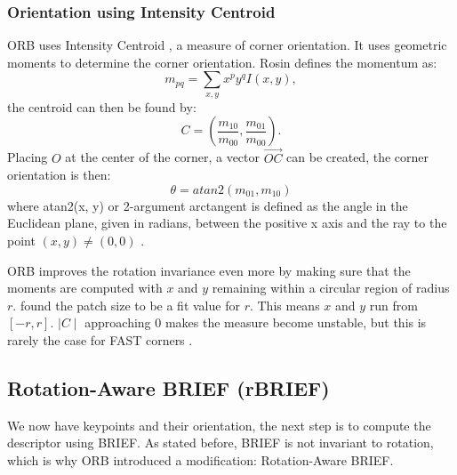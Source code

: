 \subsubsection{Orientation using Intensity Centroid}
ORB uses Intensity Centroid \cite{ROSIN1999291}, a measure of corner orientation. It uses geometric moments to determine the corner orientation. Rosin defines the momentum as: 
\begin{equation}
    m_{pq} = \sum_{x,y} x^p y^q I(x, y),
\end{equation}
the centroid can then be found by:
\begin{equation}
    C = (\frac{m_{10}}{m_{00}},\frac{m_{01}}{m_{00}}).
\end{equation}
Placing $O$ at the center of the corner, a vector $\Vec{OC}$ can be created, the corner orientation is then:
\begin{equation}
    \theta = atan2(m_{01}, m_{10})
\end{equation}
where atan2(x, y) or 2-argument arctangent is defined as the angle in the Euclidean plane, given in radians, between the positive x axis and the ray to the point $(x, y) \neq (0, 0)$ \cite{unknown-author-2022}.\bigskip

ORB improves the rotation invariance even more by making sure that the moments are computed with $x$ and $y$ remaining within a circular region of radius $r$. \cite{6126544} found the patch size to be a fit value for $r$. This means $x$ and $y$ run from $[-r, r]$. $\mid C\mid$ approaching 0 makes the measure become unstable, but this is rarely the case for FAST corners \cite{6126544}.

\subsection{Rotation-Aware BRIEF (rBRIEF)}
We now have keypoints and their orientation, the next step is to compute the descriptor using BRIEF. As stated before, BRIEF is not invariant to rotation, which is why ORB introduced a modification: Rotation-Aware BRIEF.

